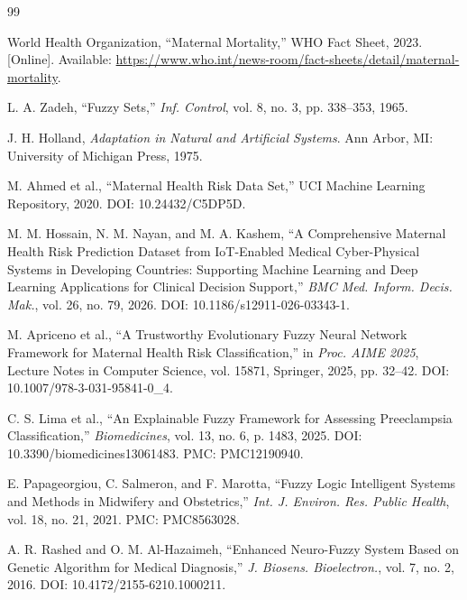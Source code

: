 \documentclass[11pt]{article}
\begin{document}
{
    \renewcommand{\refname}{}
    \vspace{-1.5em}

    \begin{thebibliography}{99}

        World Health Organization, ``Maternal Mortality,'' WHO Fact Sheet, 2023. [Online]. Available: \url{https://www.who.int/news-room/fact-sheets/detail/maternal-mortality}.

        L. A. Zadeh, ``Fuzzy Sets,'' \textit{Inf. Control}, vol. 8, no. 3, pp. 338--353, 1965.

        J. H. Holland, \textit{Adaptation in Natural and Artificial Systems}. Ann Arbor, MI: University of Michigan Press, 1975.

        M. Ahmed et al., ``Maternal Health Risk Data Set,'' UCI Machine Learning Repository, 2020. DOI: 10.24432/C5DP5D.


        M. M. Hossain, N. M. Nayan, and M. A. Kashem, ``A Comprehensive Maternal Health Risk Prediction Dataset from IoT-Enabled Medical Cyber-Physical Systems in Developing Countries: Supporting Machine Learning and Deep Learning Applications for Clinical Decision Support,'' \textit{BMC Med. Inform. Decis. Mak.}, vol. 26, no. 79, 2026. DOI: 10.1186/s12911-026-03343-1.


        M. Apriceno et al., ``A Trustworthy Evolutionary Fuzzy Neural Network Framework for Maternal Health Risk Classification,'' in \textit{Proc. AIME 2025}, Lecture Notes in Computer Science, vol. 15871, Springer, 2025, pp. 32--42. DOI: 10.1007/978-3-031-95841-0\_4.

        C. S. Lima et al., ``An Explainable Fuzzy Framework for Assessing Preeclampsia Classification,'' \textit{Biomedicines}, vol. 13, no. 6, p. 1483, 2025. DOI: 10.3390/biomedicines13061483. PMC: PMC12190940.

        E. Papageorgiou, C. Salmeron, and F. Marotta, ``Fuzzy Logic Intelligent Systems and Methods in Midwifery and Obstetrics,'' \textit{Int. J. Environ. Res. Public Health}, vol. 18, no. 21, 2021. PMC: PMC8563028.

        A. R. Rashed and O. M. Al-Hazaimeh, ``Enhanced Neuro-Fuzzy System Based on Genetic Algorithm for Medical Diagnosis,'' \textit{J. Biosens. Bioelectron.}, vol. 7, no. 2, 2016. DOI: 10.4172/2155-6210.1000211.


\end{thebibliography}}
\end{document}
